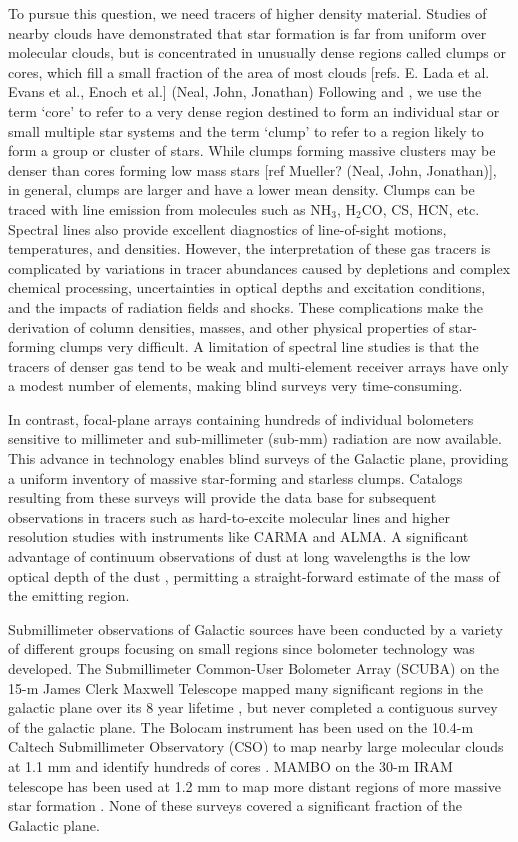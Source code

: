 \documentclass[12pt,preprint]{aastex}
\newcommand{\ammonia}{\mbox{{\rm NH}$_3$}}
\newcommand{\form}{H$_2$CO}
\begin{document}
To pursue this question, we need tracers of higher density material.
Studies of nearby clouds have demonstrated that star formation is far
from uniform over molecular clouds, but is concentrated in unusually dense
regions called clumps or cores, which fill a small fraction of the area of most
clouds \citep{enoch06,evans09}[refs. E. Lada et al. Evans et al., Enoch et al.]
(Neal, John, Jonathan) Following \citet{williams00} and \citep{mckee07}, we use
the term `core' to refer to a very dense region destined to form an individual
star or small multiple star systems and the term `clump' to refer to a region
likely to form a group or cluster of stars. While clumps forming massive
clusters may be denser than cores forming low mass stars [ref Mueller? (Neal,
John, Jonathan)], in general, clumps are larger and have a lower mean density. Clumps can be
traced with line emission from molecules such as \ammonia, \form, CS, HCN, etc.
Spectral lines also provide excellent diagnostics of line-of-sight motions,
temperatures, and densities.  However, the interpretation of these gas tracers
is complicated by variations in tracer abundances caused by depletions and
complex chemical processing, uncertainties in optical depths and excitation
conditions, and the impacts of radiation fields and shocks. These complications
make the derivation of column densities, masses, and other physical properties
of star-forming clumps very difficult.  A limitation of spectral line studies
is that the tracers of denser gas tend to be weak and multi-element receiver
arrays have only a modest number of elements, making blind surveys very
time-consuming.

In contrast, focal-plane arrays containing hundreds of individual bolometers
sensitive to millimeter and sub-millimeter (sub-mm) radiation are now
available. This advance in technology enables blind surveys of the Galactic
plane, providing a uniform inventory of massive star-forming and starless
clumps.  Catalogs resulting from these surveys will provide the data base for
subsequent observations in tracers such as hard-to-excite molecular lines and
higher resolution studies with instruments like CARMA and ALMA.  A significant
advantage of continuum observations of dust at long wavelengths is the low
optical depth of the dust \citep{johnstone06}, permitting a straight-forward
estimate of the mass of the emitting region.

Submillimeter observations of Galactic sources have been conducted by
a variety of different groups focusing on small regions since
bolometer technology was developed.  The Submillimeter Common-User
Bolometer Array (SCUBA) on the 15-m James Clerk Maxwell Telescope
mapped many significant regions in the galactic plane over its 8 year
lifetime \citep{holland99,difrancesco08}, but never completed a
contiguous survey of the galactic plane.  The Bolocam instrument has been
used on the 10.4-m Caltech Submillimeter Observatory (CSO) to map nearby large
molecular clouds at 1.1 mm and identify hundreds of cores \citep{enoch06}.
MAMBO on the 30-m IRAM telescope has been used at 1.2 mm to map
more distant regions of more massive star formation \citep{motte07}.
None of these surveys covered a significant fraction of the Galactic plane.
\end{document}
